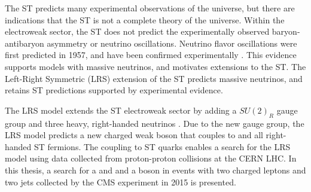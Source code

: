 The ST predicts many experimental observations of the universe, but there are indications that the ST is 
not a complete theory of the universe.  Within the electroweak sector, the ST does 
not predict the experimentally observed baryon-antibaryon asymmetry or neutrino oscillations.  Neutrino flavor 
oscillations were first predicted in 1957, and have been confirmed experimentally 
\cite{kamiokandeTwo,solarNuSummary,NOvAresults,mainzPhaseIIResults,t2kResults,dayaBayResults}.  This evidence supports 
models with massive neutrinos, and motivates extensions to the ST.  The Left-Right Symmetric (LRS) extension of 
the ST predicts massive neutrinos, and retains ST predictions supported by experimental evidence.

The LRS model extends the ST electroweak sector by adding a $SU(2)_{R}$ gauge group and three heavy, right-handed 
neutrinos \nul.  Due to the new gauge group, the LRS model predicts a new charged weak boson \WR that couples to 
\nul and all right-handed ST fermions.  The \WR coupling to ST quarks enables a search for the LRS model using 
data collected from proton-proton collisions at the CERN LHC.  In this thesis, a search for a \WR and \nul 
and a \WR boson in events with two charged leptons and two jets collected by the CMS experiment in 2015 
is presented.

